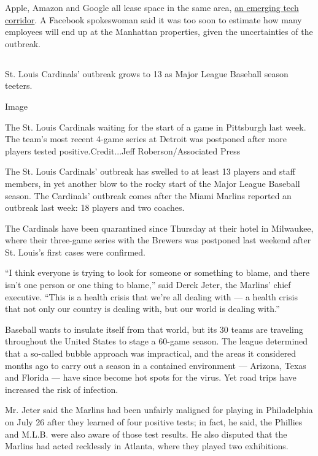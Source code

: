 Apple, Amazon and Google all lease space in the same area,
\href{https://www.nytimes3xbfgragh.onion/2020/01/05/nyregion/nyc-tech-facebook-amazon-google.html}{an
emerging tech corridor}. A Facebook spokeswoman said it was too soon to
estimate how many employees will end up at the Manhattan properties,
given the uncertainties of the outbreak.

\hypertarget{-8}{%
\subsection{}\label{-8}}

St. Louis Cardinals' outbreak grows to 13 as Major League Baseball
season teeters.

Image

The St. Louis Cardinals waiting for the start of a game in Pittsburgh
last week. The team's most recent 4-game series at Detroit was postponed
after more players tested positive.Credit...Jeff Roberson/Associated
Press

The St. Louis Cardinals' outbreak has swelled to at least 13 players and
staff members, in yet another blow to the rocky start of the Major
League Baseball season. The Cardinals' outbreak comes after the Miami
Marlins reported an outbreak last week: 18 players and two coaches.

The Cardinals have been quarantined since Thursday at their hotel in
Milwaukee, where their three-game series with the Brewers was postponed
last weekend after St. Louis's first cases were confirmed.

``I think everyone is trying to look for someone or something to blame,
and there isn't one person or one thing to blame,'' said Derek Jeter,
the Marlins' chief executive. ``This is a health crisis that we're all
dealing with --- a health crisis that not only our country is dealing
with, but our world is dealing with.''

Baseball wants to insulate itself from that world, but its 30 teams are
traveling throughout the United States to stage a 60-game season. The
league determined that a so-called bubble approach was impractical, and
the areas it considered months ago to carry out a season in a contained
environment --- Arizona, Texas and Florida --- have since become hot
spots for the virus. Yet road trips have increased the risk of
infection.

Mr. Jeter said the Marlins had been unfairly maligned for playing in
Philadelphia on July 26 after they learned of four positive tests; in
fact, he said, the Phillies and M.L.B. were also aware of those test
results. He also disputed that the Marlins had acted recklessly in
Atlanta, where they played two exhibitions.

